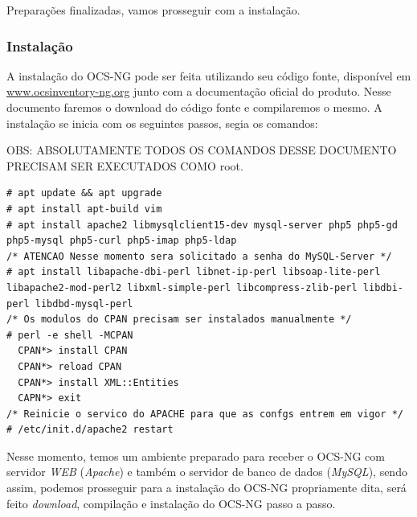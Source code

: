 \documentclass[
               12pt,             %
               a4paper,          %
               chapter=TITLE,    %
               section=TITLE,    %
               english,
               brazil            
]{article}
\begin{document}
Preparações finalizadas, vamos prosseguir com a instalação.

\subsubsection{Instalação}

A instalação do OCS-NG pode ser feita utilizando seu código fonte, disponível em \href{www.ocsinventory-ng.org}{www.ocsinventory-ng.org} junto com a documentação oficial do produto. Nesse documento faremos o download do código fonte e compilaremos o mesmo. A instalação se inicia com os seguintes passos, segia os comandos:

OBS: ABSOLUTAMENTE TODOS OS COMANDOS DESSE DOCUMENTO PRECISAM SER EXECUTADOS COMO root.

\begin{lstlisting}
# apt update && apt upgrade
# apt install apt-build vim
# apt install apache2 libmysqlclient15-dev mysql-server php5 php5-gd php5-mysql php5-curl php5-imap php5-ldap
/* ATENCAO Nesse momento sera solicitado a senha do MySQL-Server */
# apt install libapache-dbi-perl libnet-ip-perl libsoap-lite-perl libapache2-mod-perl2 libxml-simple-perl libcompress-zlib-perl libdbi-perl libdbd-mysql-perl
/* Os modulos do CPAN precisam ser instalados manualmente */
# perl -e shell -MCPAN
  CPAN*> install CPAN
  CPAN*> reload CPAN
  CPAN*> install XML::Entities
  CAPN*> exit
/* Reinicie o servico do APACHE para que as confgs entrem em vigor */
# /etc/init.d/apache2 restart
\end{lstlisting} 

Nesse momento, temos um ambiente preparado para receber o OCS-NG com servidor \textit{WEB} (\textit{Apache}) e também o servidor de banco de dados (\textit{MySQL}), sendo assim, podemos prosseguir para a instalação do OCS-NG propriamente dita, será feito \textit{download}, compilação e instalação do OCS-NG passo a passo.\\
\end{document}
